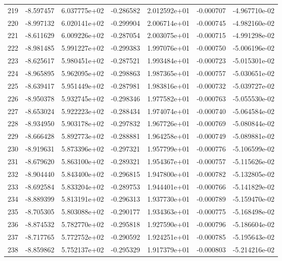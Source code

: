 \begin{tabular}{rrrrrrr}
 219 &  -8.597457 &  6.037775e+02 & -0.286582 &  2.012592e+01 &   -0.000707 & -4.967710e-02 \\
 220 &  -8.997132 &  6.020141e+02 & -0.299904 &  2.006714e+01 &   -0.000745 & -4.982160e-02 \\
 221 &  -8.611629 &  6.009226e+02 & -0.287054 &  2.003075e+01 &   -0.000715 & -4.991298e-02 \\
 222 &  -8.981485 &  5.991227e+02 & -0.299383 &  1.997076e+01 &   -0.000750 & -5.006196e-02 \\
 223 &  -8.625617 &  5.980451e+02 & -0.287521 &  1.993484e+01 &   -0.000723 & -5.015301e-02 \\
 224 &  -8.965895 &  5.962095e+02 & -0.298863 &  1.987365e+01 &   -0.000757 & -5.030651e-02 \\
 225 &  -8.639417 &  5.951449e+02 & -0.287981 &  1.983816e+01 &   -0.000732 & -5.039727e-02 \\
 226 &  -8.950378 &  5.932745e+02 & -0.298346 &  1.977582e+01 &   -0.000763 & -5.055530e-02 \\
 227 &  -8.653024 &  5.922223e+02 & -0.288434 &  1.974074e+01 &   -0.000740 & -5.064584e-02 \\
 228 &  -8.934950 &  5.903178e+02 & -0.297832 &  1.967726e+01 &   -0.000769 & -5.080844e-02 \\
 229 &  -8.666428 &  5.892773e+02 & -0.288881 &  1.964258e+01 &   -0.000749 & -5.089881e-02 \\
 230 &  -8.919631 &  5.873396e+02 & -0.297321 &  1.957799e+01 &   -0.000776 & -5.106599e-02 \\
 231 &  -8.679620 &  5.863100e+02 & -0.289321 &  1.954367e+01 &   -0.000757 & -5.115626e-02 \\
 232 &  -8.904440 &  5.843400e+02 & -0.296815 &  1.947800e+01 &   -0.000782 & -5.132805e-02 \\
 233 &  -8.692584 &  5.833204e+02 & -0.289753 &  1.944401e+01 &   -0.000766 & -5.141829e-02 \\
 234 &  -8.889399 &  5.813191e+02 & -0.296313 &  1.937730e+01 &   -0.000789 & -5.159470e-02 \\
 235 &  -8.705305 &  5.803088e+02 & -0.290177 &  1.934363e+01 &   -0.000775 & -5.168498e-02 \\
 236 &  -8.874532 &  5.782770e+02 & -0.295818 &  1.927590e+01 &   -0.000796 & -5.186604e-02 \\
 237 &  -8.717765 &  5.772752e+02 & -0.290592 &  1.924251e+01 &   -0.000785 & -5.195643e-02 \\
 238 &  -8.859862 &  5.752137e+02 & -0.295329 &  1.917379e+01 &   -0.000803 & -5.214216e-02 \\

\end{tabular}
